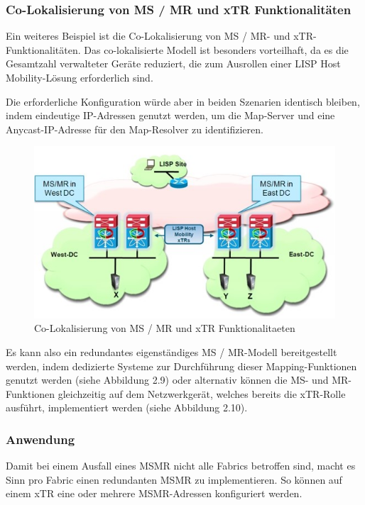 \subsubsection{Co-Lokalisierung von MS / MR und xTR Funktionalitäten}

Ein weiteres Beispiel ist die Co-Lokalisierung  von MS / MR- und xTR-Funktionalitäten. Das co-lokalisierte Modell ist besonders vorteilhaft, da es die Gesamtzahl verwalteter Geräte reduziert, die zum Ausrollen einer LISP Host Mobility-Lösung erforderlich sind. 

Die erforderliche Konfiguration würde aber in beiden Szenarien identisch bleiben, indem eindeutige IP-Adressen genutzt werden, um die Map-Server und eine Anycast-IP-Adresse für den Map-Resolver zu identifizieren.

\begin{figure}[H]
	\centering
	\includegraphics[width=0.8\linewidth]{img/Absicherung/LISP-Example2}
	\caption{Co-Lokalisierung von MS / MR und xTR Funktionalitaeten \cite{LISP-mobility} }
	\label{fig:Co-Lokalisierung von MS / MR und xTR Funktionalitaeten}
\end{figure}

Es kann also ein redundantes eigenständiges MS / MR-Modell bereitgestellt werden, indem dedizierte Systeme zur Durchführung dieser Mapping-Funktionen genutzt werden (siehe Abbildung 2.9) oder alternativ können die MS- und MR-Funktionen gleichzeitig auf dem Netzwerkgerät, welches bereits die xTR-Rolle ausführt, implementiert werden (siehe Abbildung 2.10).

\subsubsection{Anwendung}
Damit bei einem Ausfall eines MSMR nicht alle Fabrics betroffen sind, macht es Sinn pro Fabric einen redundanten MSMR zu implementieren. So können auf einem xTR eine oder mehrere MSMR-Adressen konfiguriert werden.

